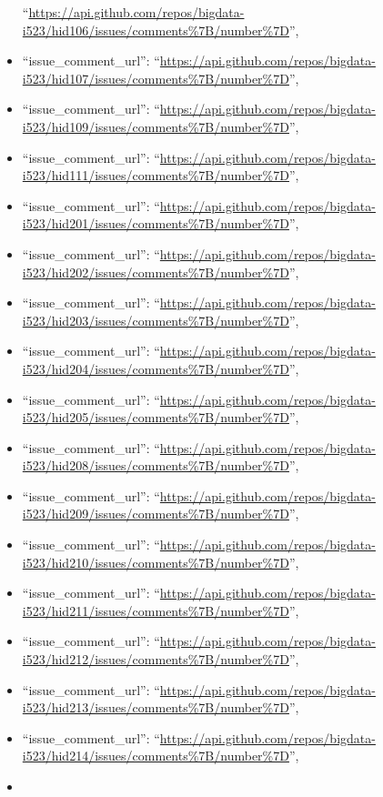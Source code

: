\begin{itemize}
  ``\url{https://api.github.com/repos/bigdata-i523/hid106/issues/comments\%7B/number\%7D}'',
\item
  ``issue\_comment\_url'':
  ``\url{https://api.github.com/repos/bigdata-i523/hid107/issues/comments\%7B/number\%7D}'',
\item
  ``issue\_comment\_url'':
  ``\url{https://api.github.com/repos/bigdata-i523/hid109/issues/comments\%7B/number\%7D}'',
\item
  ``issue\_comment\_url'':
  ``\url{https://api.github.com/repos/bigdata-i523/hid111/issues/comments\%7B/number\%7D}'',
\item
  ``issue\_comment\_url'':
  ``\url{https://api.github.com/repos/bigdata-i523/hid201/issues/comments\%7B/number\%7D}'',
\item
  ``issue\_comment\_url'':
  ``\url{https://api.github.com/repos/bigdata-i523/hid202/issues/comments\%7B/number\%7D}'',
\item
  ``issue\_comment\_url'':
  ``\url{https://api.github.com/repos/bigdata-i523/hid203/issues/comments\%7B/number\%7D}'',
\item
  ``issue\_comment\_url'':
  ``\url{https://api.github.com/repos/bigdata-i523/hid204/issues/comments\%7B/number\%7D}'',
\item
  ``issue\_comment\_url'':
  ``\url{https://api.github.com/repos/bigdata-i523/hid205/issues/comments\%7B/number\%7D}'',
\item
  ``issue\_comment\_url'':
  ``\url{https://api.github.com/repos/bigdata-i523/hid208/issues/comments\%7B/number\%7D}'',
\item
  ``issue\_comment\_url'':
  ``\url{https://api.github.com/repos/bigdata-i523/hid209/issues/comments\%7B/number\%7D}'',
\item
  ``issue\_comment\_url'':
  ``\url{https://api.github.com/repos/bigdata-i523/hid210/issues/comments\%7B/number\%7D}'',
\item
  ``issue\_comment\_url'':
  ``\url{https://api.github.com/repos/bigdata-i523/hid211/issues/comments\%7B/number\%7D}'',
\item
  ``issue\_comment\_url'':
  ``\url{https://api.github.com/repos/bigdata-i523/hid212/issues/comments\%7B/number\%7D}'',
\item
  ``issue\_comment\_url'':
  ``\url{https://api.github.com/repos/bigdata-i523/hid213/issues/comments\%7B/number\%7D}'',
\item
  ``issue\_comment\_url'':
  ``\url{https://api.github.com/repos/bigdata-i523/hid214/issues/comments\%7B/number\%7D}'',
\item

\end{itemize}
